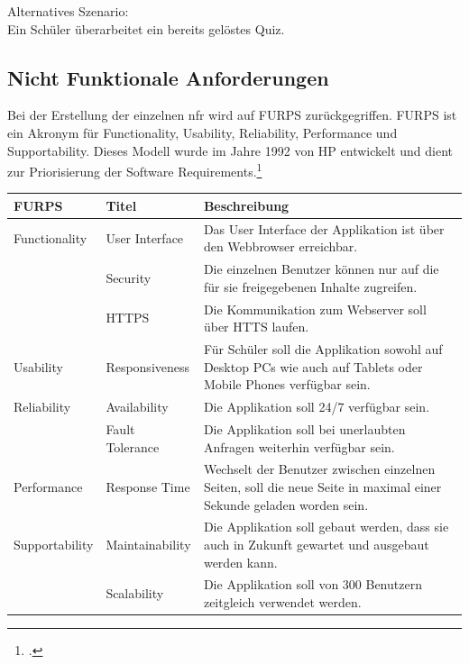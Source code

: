 \noindent Alternatives Szenario: \\
Ein Schüler überarbeitet ein bereits gelöstes Quiz. \\


\subsection{Nicht Funktionale Anforderungen}
Bei der Erstellung der einzelnen \gls{nfr} wird auf FURPS zurückgegriffen. FURPS ist ein Akronym für Functionality, Usability, Reliability, Performance und Supportability. Dieses Modell wurde im Jahre 1992 von HP entwickelt und dient zur Priorisierung der Software Requirements.\footcite{furps_description}

\begin{table}[h]
	\centering
	\begin{tabu} to 0.9\textwidth {l l X}
	\toprule
	FURPS & Titel & Beschreibung \\ 
	\midrule
	Functionality & User Interface & Das User Interface der Applikation ist über den Webbrowser erreichbar. \\ 
	& Security & Die einzelnen Benutzer können nur auf die für sie freigegebenen Inhalte zugreifen. \\
	& HTTPS & Die Kommunikation zum Webserver soll über HTTS laufen. \\
	\midrule
	Usability & Responsiveness & Für Schüler soll die Applikation sowohl auf Desktop PCs wie auch auf Tablets oder Mobile Phones verfügbar sein. \\
	\midrule
	Reliability & Availability & Die Applikation soll 24/7 verfügbar sein. \\
	 & Fault Tolerance & Die Applikation soll bei unerlaubten Anfragen weiterhin verfügbar sein. \\
	\midrule
	Performance & Response Time & Wechselt der Benutzer zwischen einzelnen Seiten, soll die neue Seite in maximal einer Sekunde geladen worden sein.\\
	\midrule
	Supportability & Maintainability & Die Applikation soll gebaut werden, dass sie auch in Zukunft gewartet und ausgebaut werden kann. \\
	 & Scalability & Die Applikation soll von 300 Benutzern zeitgleich verwendet werden. \\
	\bottomrule
	\end{tabu}
\end{table}

